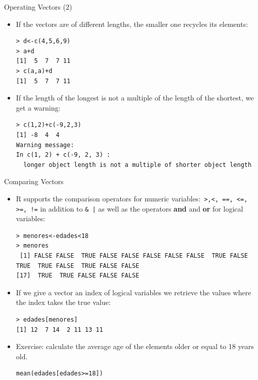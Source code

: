 \documentclass[handout]{beamer}
\begin{document}
\begin{frame}[fragile]{Operating Vectors (2)}
\scriptsize{
\begin{itemize}
\item If the vectors are of different lengths, the smaller one recycles its elements:
\begin{verbatim}
> d<-c(4,5,6,9)
> a+d
[1]  5  7  7 11
> c(a,a)+d
[1]  5  7  7 11
\end{verbatim}

\item If the length of the longest is not a multiple of the length of the shortest, we get a warning:
\begin{verbatim}
> c(1,2)+c(-9,2,3)
[1] -8  4  4
Warning message:
In c(1, 2) + c(-9, 2, 3) :
  longer object length is not a multiple of shorter object length 
\end{verbatim}
 
\end{itemize}
 }
\end{frame}



\begin{frame}[fragile]{Comparing Vectors}
\scriptsize{
\begin{itemize}
 \item R supports the comparison operators for numeric variables:\verb+ >,<, ==, <=, >=, !=+ in addition to \verb+& |+ as well as the operators \textbf{and} and \textbf{or} for logical variables:
\begin{verbatim}
> menores<-edades<18
> menores
 [1] FALSE FALSE  TRUE FALSE FALSE FALSE FALSE FALSE  TRUE FALSE  TRUE  TRUE FALSE  TRUE FALSE FALSE
[17]  TRUE  TRUE FALSE FALSE FALSE
\end{verbatim}
\item If we give a vector an index of logical variables we retrieve the values where the index takes the true value: 
\begin{verbatim}
> edades[menores] 
[1] 12  7 14  2 11 13 11
\end{verbatim}

\item Exercise: calculate the average age of the elements older or equal to 18 years old.
\begin{verbatim}
mean(edades[edades>=18]) 
\end{verbatim}

 
\end{itemize}



}
\end{frame}
\end{document}
